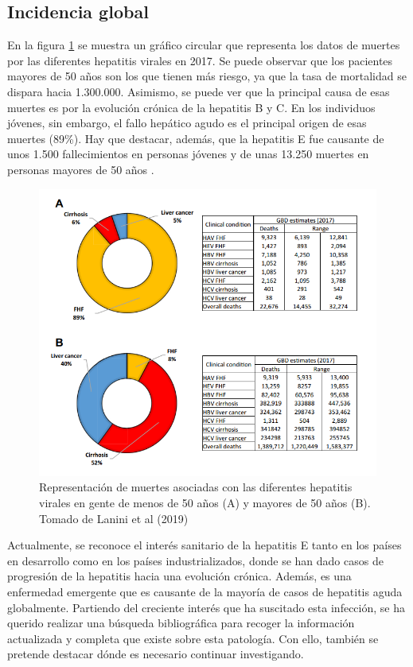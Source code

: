 \documentclass[11 pt]{article}
\begin{document}
\subsection{Incidencia global}
En la figura \ref{laninigrafico} se muestra un gráfico circular que representa los datos de muertes por las diferentes hepatitis virales en 2017. Se puede observar que los pacientes mayores de 50 años son los que tienen más riesgo, ya que la tasa de mortalidad se dispara hacia 1.300.000. Asimismo, se puede ver que la principal causa de esas muertes es por la evolución crónica de la hepatitis B y C. En los individuos jóvenes, sin embargo, el fallo hepático agudo es el principal origen de esas muertes (89\%). Hay que destacar, además, que la hepatitis E fue causante de unos 1.500 fallecimientos en personas jóvenes y de unas 13.250 muertes en personas mayores de 50 años \cite{Lanini2019}.
\begin{figure} [h!] 
	\centering
	\includegraphics[width=0.75\linewidth]{imagenes/graficoincidenciahepatitis.png}
	\caption[loftitle]{Representación de muertes asociadas con las diferentes hepatitis virales en gente de menos de 50 años (A) y mayores de 50 años (B). Tomado de Lanini et al (2019) \cite{Lanini2019}}
	\label{laninigrafico}
\end{figure}

Actualmente, se reconoce el interés sanitario de la hepatitis E tanto en los países en desarrollo como en los países industrializados, donde se han dado casos de progresión de la hepatitis hacia una evolución crónica. Además, es una enfermedad emergente que es causante de la mayoría de casos de hepatitis aguda globalmente. Partiendo del creciente interés que ha suscitado esta infección, se ha querido realizar una búsqueda bibliográfica para recoger la información actualizada y completa que existe sobre esta patología. Con ello, también se pretende destacar dónde es necesario continuar investigando.
\end{document}

